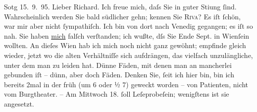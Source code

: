 \pstart
           \raggedleft{}{\pb}So{\geminationn}tg 15. 9. 95.\pend
           \vspace{0.5em}
\pstart
           Lieber Richard. Ich freue mich, daſs Sie in guter Sti{\geminationm}ung{ }ſind. Wahrscheinlich werden Sie bald südlicher
               gehn; kennen Sie \textsc{Riva}? Es iſt{ }ſchön, war \introOben{}mir\introOben{} aber nicht{ }ſympathiſch. Ich bin
               von dort nach Venedig gegangen; es iſt so nah.
               Sie haben \uline{mich} falſch verſtanden; ich wußte, dſs Sie
               Ende Sept. in Wienſein wollten. An dieſes Wien hab ich mich noch nicht ganz gewöhnt; empfinde gleich
               wieder, jetzt wo die alten Verhältniſſe sich aufdrängen, das vielfach unzulängliche,
               unter dem man zu leiden hat. Dünne Fäden, mit denen {\pb}man an mancherlei gebunden iſt – dünn, aber doch Fäden. Denken Sie,{ }ſeit ich hier
               bin, bin ich bereits 2mal in der früh \introOben{}(um 6 oder ½ 7)\introOben{}
                geweckt worden – von Patienten, nicht vom Burgtheater. – Am Mittwoch 18.{ }ſoll Leſeprobeſein; wenigſtens ist sie angesetzt.\pend
           
